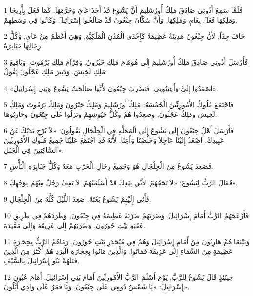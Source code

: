 \par 1 فَلَمَّا سَمِعَ أَدُونِي صَادَقَ مَلِكُ أُورُشَلِيمَ أَنَّ يَشُوعَ قَدْ أَخَذَ عَايَ وَحَرَّمَهَا. كَمَا فَعَلَ بِأَرِيحَا وَمَلِكِهَا فَعَلَ بِعَايٍ وَمَلِكِهَا, وَأَنَّ سُكَّانَ جِبْعُونَ قَدْ صَالَحُوا إِسْرَائِيلَ وَكَانُوا فِي وَسَطِهِمْ,
\par 2 خَافَ جِدّاً, لأَنَّ جِبْعُونَ مَدِينَةٌ عَظِيمَةٌ كَإِحْدَى الْمُدُنِ الْمَلَكِيَّةِ, وَهِيَ أَعْظَمُ مِنْ عَايٍ, وَكُلُّ رِجَالِهَا جَبَابِرَةٌ.
\par 3 فَأَرْسَلَ أَدُونِي صَادِقَ مَلِكُ أُورُشَلِيمَ إِلَى هُوهَامَ مَلِكِ حَبْرُونَ, وَفِرْآمَ مَلِكِ يَرْمُوتَ, وَيَافِيعَ مَلِكِ لَخِيشَ, وَدَبِيرَ مَلِكِ عَجْلُونَ يَقُولُ:
\par 4 «اصْعَدُوا إِلَيَّ وَأَعِينُونِي, فَنَضْرِبَ جِبْعُونَ لأَنَّهَا صَالَحَتْ يَشُوعَ وَبَنِي إِسْرَائِيلَ».
\par 5 فَاجْتَمَعَ مُلُوكُ الأَمُورِيِّينَ الْخَمْسَةُ: مَلِكُ أُورُشَلِيمَ وَمَلِكُ حَبْرُونَ وَمَلِكُ يَرْمُوتَ وَمَلِكُ لَخِيشَ وَمَلِكُ عَجْلُونَ, وَصَعِدُوا هُمْ وَكُلُّ جُيُوشِهِمْ وَنَزَلُوا عَلَى جِبْعُونَ وَحَارَبُوهَا.
\par 6 فَأَرْسَلَ أَهْلُ جِبْعُونَ إِلَى يَشُوعَ إِلَى الْمَحَلَّةِ فِي الْجِلْجَالِ يَقُولُونَ: «لاَ تُرْخِ يَدَيْكَ عَنْ عَبِيدِكَ. اصْعَدْ إِلَيْنَا عَاجِلاً وَخَلِّصْنَا وَأَعِنَّا, لأَنَّهُ قَدِ اجْتَمَعَ عَلَيْنَا جَمِيعُ مُلُوكِ الأَمُورِيِّينَ السَّاكِنِينَ فِي الْجَبَلِ».
\par 7 فَصَعِدَ يَشُوعُ مِنَ الْجِلْجَالِ هُوَ وَجَمِيعُ رِجَالِ الْحَرْبِ مَعَهُ وَكُلُّ جَبَابِرَةِ الْبَأْسِ.
\par 8 فَقَالَ الرَّبُّ لِيَشُوعَ: «لاَ تَخَفْهُمْ, لأَنِّي بِيَدِكَ قَدْ أَسْلَمْتُهُمْ. لاَ يَقِفُ رَجُلٌ مِنْهُمْ بِوَجْهِكَ».
\par 9 فَأَتَى إِلَيْهِمْ يَشُوعُ بَغْتَةً. صَعِدَ اللَّيْلَ كُلَّهُ مِنَ الْجِلْجَالِ.
\par 10 فَأَزْعَجَهُمُ الرَّبُّ أَمَامَ إِسْرَائِيلَ, وَضَرَبَهُمْ ضَرْبَةً عَظِيمَةً فِي جِبْعُونَ, وَطَرَدَهُمْ فِي طَرِيقِ عَقَبَةِ بَيْتِ حُورُونَ, وَضَرَبَهُمْ إِلَى عَزِيقَةَ وَإِلَى مَقِّيدَةَ.
\par 11 وَبَيْنَمَا هُمْ هَارِبُونَ مِنْ أَمَامِ إِسْرَائِيلَ وَهُمْ فِي مُنْحَدَرِ بَيْتِ حُورُونَ, رَمَاهُمُ الرَّبُّ بِحِجَارَةٍ عَظِيمَةٍ مِنَ السَّمَاءِ إِلَى عَزِيقَةَ فَمَاتُوا. وَالَّذِينَ مَاتُوا بِحِجَارَةِ الْبَرَدِ هُمْ أَكْثَرُ مِنَ الَّذِينَ قَتَلَهُمْ بَنُو إِسْرَائِيلَ بِالسَّيْفِ.
\par 12 حِينَئِذٍ قَالَ يَشُوعُ لِلرَّبَّ, يَوْمَ أَسْلَمَ الرَّبُّ الأَمُورِيِّينَ أَمَامَ بَنِي إِسْرَائِيلَ, أَمَامَ عُيُونِ إِسْرَائِيلَ: «يَا شَمْسُ دُومِي عَلَى جِبْعُونَ, وَيَا قَمَرُ عَلَى وَادِي أَيَّلُونَ».
